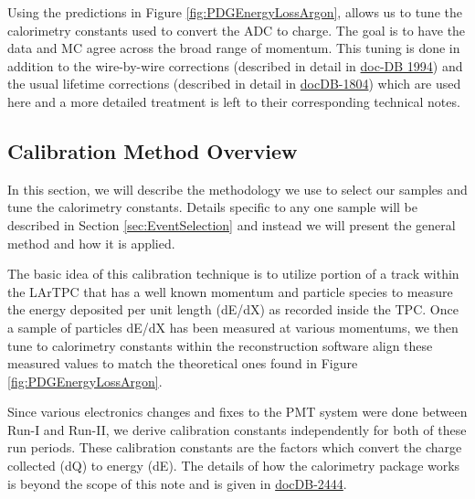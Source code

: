 Using the predictions in Figure \ref{fig:PDGEnergyLossArgon}, allows us to tune the calorimetry constants used to convert the ADC to charge. The goal is to have the data and MC agree across the broad range of momentum. This tuning is done in addition to the wire-by-wire corrections (described in detail in \href{http://lartpc-docdb.fnal.gov:8080/cgi-bin/RetrieveFile?docid=1994&filename=investigation-uniformity-observed_v3.pdf&version=2}{doc-DB 1994}) and the usual lifetime corrections (described in detail in \href{http://lartpc-docdb.fnal.gov:8080/cgi-bin/ShowDocument?docid=1804}{docDB-1804}) which are used here and a more detailed treatment is left to their corresponding technical notes.

\subsection{Calibration Method Overview}\label{sec:MethodOverview}

In this section, we will describe the methodology we use to select our samples and tune the calorimetry constants. Details specific to any one sample will be described in Section  \ref{sec:EventSelection} and instead we will present the general method and how it is applied. 

The basic idea of this calibration technique is to utilize portion of a track within the LArTPC that has a well known momentum and particle species to measure the energy deposited per unit length (dE/dX) as recorded inside the TPC. Once a sample of particles dE/dX has been measured at various momentums, we then tune to calorimetry constants within the reconstruction software align these measured values to match the theoretical ones found in Figure \ref{fig:PDGEnergyLossArgon}.

Since various electronics changes and fixes to the PMT system were done between Run-I and Run-II, we derive calibration constants independently for both of these run periods. These calibration constants are the factors which convert the charge collected (dQ) to energy (dE). The details of how the calorimetry package works is beyond the scope of this note and is given in \href{http://lartpc-docdb.fnal.gov:8080/cgi-bin/ShowDocument?docid=2444}{docDB-2444}.

